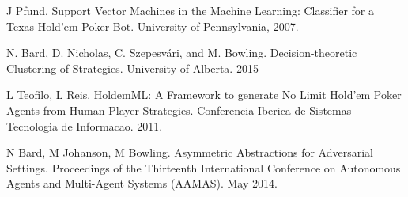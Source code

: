 \documentclass[twoside]{article}
\begin{document}
\begin{multicols}{2}

\begin{thebibliography}{99} %
 J Pfund. Support Vector Machines in the Machine Learning: Classifier for a Texas Hold'em Poker Bot.  University of Pennsylvania, 2007.

 N. Bard, D. Nicholas, C. Szepesvári, and M. Bowling. Decision-theoretic Clustering of Strategies. University of Alberta. 2015

 L Teofilo, L Reis. HoldemML: A Framework to generate No Limit Hold’em Poker Agents from Human Player Strategies. Conferencia Iberica de Sistemas Tecnologia de Informacao. 2011.

 N Bard, M Johanson, M Bowling. Asymmetric Abstractions for Adversarial Settings. Proceedings of the Thirteenth International Conference on Autonomous Agents and Multi-Agent Systems (AAMAS). May 2014.
\end{thebibliography}


\end{multicols}
\end{document}
